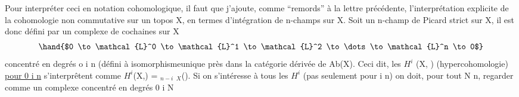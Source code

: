 Pour interpréter ceci en notation cohomologique, il faut que j'ajoute,
comme ``remords'' à la lettre précédente, l'interprétation explicite de la
cohomologie non commutative sur un topos X, en termes d'intégration de
n-champs sur X. Soit  un n-champ de Picard strict sur X, il est donc
défini par un complexe de cochaines  sur X
\[
\hand{$0 \to \mathcal{L}^0 \to \mathcal{L}^1 \to \mathcal{L}^2 \to \dots \to \mathcal{L}^n \to 0$}
\]
concentré en degrés o \hand{$\leq$} i \hand{$\leq$} n (défini à isomorphisme\hand{/}unique près dans la
catégorie dérivée de Ab(X)\hand{)}. Ceci dit, les $H^i$ (X,  ) (hypercohomologie)
\uline{pour 0 \hand{$\leq$} i \hand{$\leq$} n} s'interprêtent comme $H^i$(X,) = \hand{$\pi$}$_{n-i}$ \hand{$\Gamma$}$_X$().
Si on s'intéresse à tous les $H^i$ (pas seulement pour i \hand{$\leq$} n) on doit, pour
tout N \hand{$\geq$} n, regarder  comme un complexe concentré en degrés 0 \hand{$\leq$} i \hand{$\leq$} N

